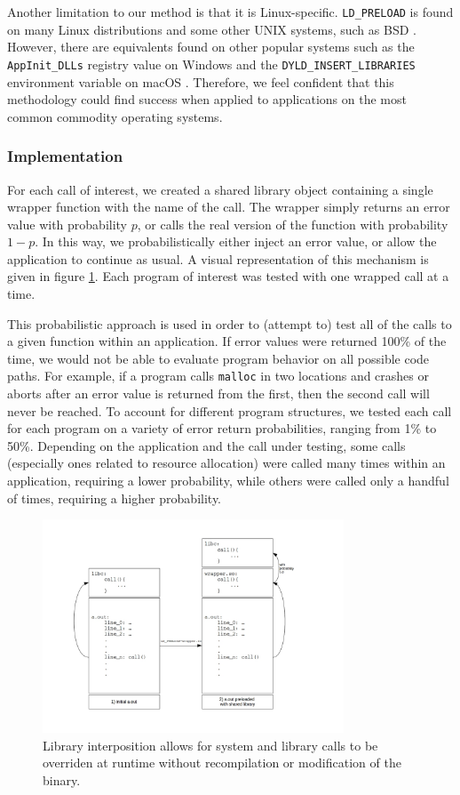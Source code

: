 Another limitation to our method is that it is Linux-specific. \texttt{LD\_PRELOAD} is found on many Linux distributions and some other UNIX systems, such as BSD \cite{bsd}. However, there are equivalents found on other popular systems such as the \texttt{AppInit\_DLLs} registry value on Windows \cite{dll} and the \texttt{DYLD\_INSERT\_LIBRARIES} environment variable on macOS \cite{macos}. Therefore, we feel confident that this methodology could find success when applied to applications on the most common commodity operating systems.

\subsubsection{Implementation}\label{ld_preload_implementation}
For each call of interest, we created a shared library object containing a single wrapper function with the name of the call. The wrapper simply returns an error value with probability $p$, or calls the real version of the function with probability $1-p$. In this way, we probabilistically either inject an error value, or allow the application to continue as usual. A visual representation of this mechanism is given in figure \ref{fig:ld_preload}. Each program of interest was tested with one wrapped call at a time.

This probabilistic approach is used in order to (attempt to) test all of the calls to a given function within an application. If error values were returned 100\% of the time, we would not be able to evaluate program behavior on all possible code paths. For example, if a program calls \texttt{malloc} in two locations and crashes or aborts after an error value is returned from the first, then the second call will never be reached. To account for different program structures, we tested each call for each program on a variety of error return probabilities, ranging from 1\% to 50\%. Depending on the application and the call under testing, some calls (especially ones related to resource allocation) were called many times within an application, requiring a lower probability, while others were called only a handful of times, requiring a higher probability.
\begin{figure}
  \centering
	\includegraphics[width=0.8\textwidth]{ldpreload_fig}
	\caption{Library interposition allows for system and library calls to be overriden at runtime without recompilation or modification of the binary.}
  \label{fig:ld_preload}
\end{figure}

